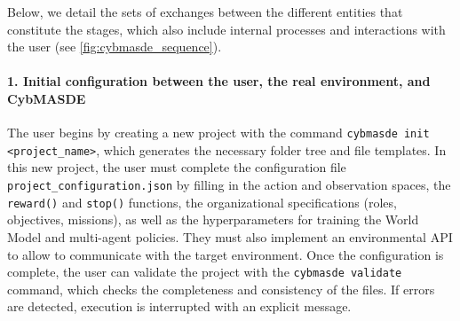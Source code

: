 Below, we detail the sets of exchanges between the different entities that constitute the stages, which also include internal processes and interactions with the user (see \autoref{fig:cybmasde_sequence}).

\paragraph{1. Initial configuration between the user, the real environment, and CybMASDE}

The user begins by creating a new project with the command \texttt{cybmasde init <project\_name>}, which generates the necessary folder tree and file templates. In this new project, the user must complete the configuration file \texttt{project_configuration.json} by filling in the action and observation spaces, the \texttt{reward()} and \texttt{stop()} functions, the organizational specifications (roles, objectives, missions), as well as the hyperparameters for training the World Model and multi-agent policies. They must also implement an environmental API to allow  to communicate with the target environment. Once the configuration is complete, the user can validate the project with the \texttt{cybmasde validate} command, which checks the completeness and consistency of the files. If errors are detected, execution is interrupted with an explicit message.

